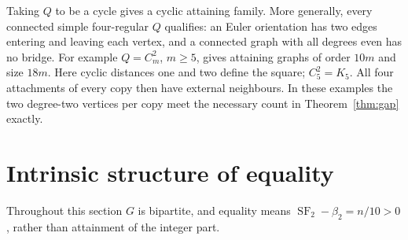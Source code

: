 \documentclass[11pt]{article}
\newcommand{\SF}{\operatorname{SF}_2}
\newcommand{\diss}{\beta_2}
\begin{document}
Taking $Q$ to be a cycle gives a cyclic attaining family. More generally,
every connected simple four-regular $Q$ qualifies: an Euler orientation
has two edges entering and leaving each vertex, and a connected graph
with all degrees even has no bridge. For example $Q=C_m^2$, $m\ge5$,
gives attaining graphs of order $10m$ and size $18m$. Here cyclic
distances one and two define the square; $C_5^2=K_5$. All four attachments
of every copy then have external neighbours. In these examples the two
degree-two vertices per copy meet the necessary count in
Theorem~\ref{thm:gap} exactly.

\section{Intrinsic structure of equality}\label{sec:equality}

Throughout this section $G$ is bipartite, and equality means $\SF-\diss=n/10>0$, rather than
attainment of the integer part.
\end{document}
